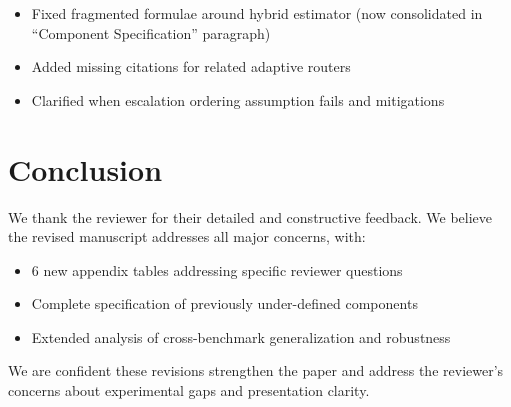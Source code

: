 \documentclass[11pt]{article}
\begin{document}
\begin{itemize}[leftmargin=*]
    \item Fixed fragmented formulae around hybrid estimator (now consolidated in ``Component Specification'' paragraph)
    \item Added missing citations for related adaptive routers
    \item Clarified when escalation ordering assumption fails and mitigations
\end{itemize}

\section*{Conclusion}

We thank the reviewer for their detailed and constructive feedback. We believe the revised manuscript addresses all major concerns, with:
\begin{itemize}[leftmargin=*,nosep]
    \item 6 new appendix tables addressing specific reviewer questions
    \item Complete specification of previously under-defined components
    \item Extended analysis of cross-benchmark generalization and robustness
\end{itemize}

We are confident these revisions strengthen the paper and address the reviewer's concerns about experimental gaps and presentation clarity.
\end{document}
